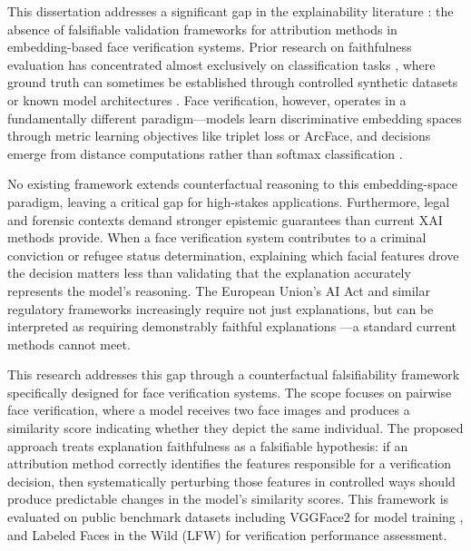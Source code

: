 This dissertation addresses a significant gap in the explainability literature \cite{Samek2021_XAI_Review}: the absence of falsifiable validation frameworks for attribution methods in embedding-based face verification systems. Prior research on faithfulness evaluation has concentrated almost exclusively on classification tasks \cite{arrieta2020explainable}, where ground truth can sometimes be established through controlled synthetic datasets or known model architectures \cite{zhou2022evaluating,Adebayo2018_SanityChecks}. Face verification, however, operates in a fundamentally different paradigm---models learn discriminative embedding spaces through metric learning objectives like triplet loss or ArcFace, and decisions emerge from distance computations rather than softmax classification \cite{schroff2015facenet,deng2019arcface,kaya2019metric}.

No existing framework extends counterfactual reasoning \cite{wachter2017counterfactual,Kenny2021_PlausibleCounterfactuals,mothilal2020diverse} to this embedding-space paradigm, leaving a critical gap for high-stakes applications. Furthermore, legal and forensic contexts demand stronger epistemic guarantees than current XAI methods provide. When a face verification system contributes to a criminal conviction or refugee status determination, explaining which facial features drove the decision matters less than validating that the explanation accurately represents the model's reasoning. The European Union's AI Act and similar regulatory frameworks increasingly require not just explanations, but can be interpreted as requiring demonstrably faithful explanations \cite{euaiact2024}---a standard current methods cannot meet.

This research addresses this gap through a counterfactual falsifiability framework specifically designed for face verification systems. The scope focuses on pairwise face verification, where a model receives two face images and produces a similarity score indicating whether they depict the same individual. The proposed approach treats explanation faithfulness as a falsifiable hypothesis: if an attribution method correctly identifies the features responsible for a verification decision, then systematically perturbing those features in controlled ways should produce predictable changes in the model's similarity scores. This framework is evaluated on public benchmark datasets including VGGFace2 for model training \cite{cao2018vggface2}, and Labeled Faces in the Wild (LFW) \cite{huang2007lfw} for verification performance assessment.


